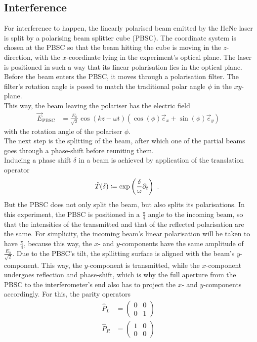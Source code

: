 \subsection{Interference}
\label{sec:Interference}
For interference to happen, the linearly polarised beam emitted by the HeNe laser is split by a polarising beam splitter cube (PBSC). The coordinate system is chosen at the PBSC so that the beam hitting the cube is moving in the $z$-direction, with the $x$-coordinate lying in the experiment's optical plane. The laser is positioned in such a way that its linear polarisation lies in the optical plane.\\
Before the beam enters the PBSC, it moves through a polarisation filter. The filter's rotation angle is posed to match the traditional polar angle $\phi$ in the $x y$-plane.\\
This way, the beam leaving the polariser has the electric field
\begin{align}
  \label{eq:E_pbsc}
  \vec{E}_\text{PBSC} &= \frac{E_0}{\sqrt{2}} \cos\left(kz - \omega t\right) \left( \cos(\phi)\vec{e}_x + \sin(\phi) \vec{e}_y \right)
\end{align}
with the rotation angle of the polariser $\phi$.\\
The next step is the splitting of the beam, after which one of the partial beams goes through a phase-shift before reuniting them.\\
Inducing a phase shift $\delta$ in a beam is achieved by application of the translation operator 
\begin{align}
  \hat T(\delta) \coloneqq \exp\left(\frac{\delta}{\omega} \partial_t\right) \text{ . }
\end{align}
But the PBSC does not only split the beam, but also splits its polarisations. In this experiment, the PBSC is positioned in a $\frac{\pi}{4}$ angle to the incoming beam, so that the intensities of the transmitted and that of the reflected polarisation are the same. For simplicity, the incoming beam's linear polarisation will be taken to have $\frac{\pi}{4}$, because this way, the $x$- and $y$-components have the same amplitude of $\frac{E_0}{\sqrt{2}}$. Due to the PBSC's tilt, the spllitting surface is aligned with the beam's $y$-component. This way, the $y$-component is transmitted, while the $x$-component undergoes reflection and phase-shift, which is why the full aperture from the PBSC to the interferometer's end also has to project the $x$- and $y$-components accordingly. For this, the parity operators 
\begin{align}
  \hat{P}_L &=
  \begin{pmatrix}
      0 & 0 \\
      0 & 1 
  \end{pmatrix} \\
  \hat{P}_R &=
  \begin{pmatrix}
      1 & 0 \\
      0 & 0 
  \end{pmatrix}
\end{align}
